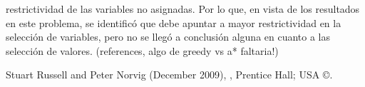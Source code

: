 \documentclass[%
    final,
    reprint,
    notitlepage,
    narroweqnarray,
    inline,
    twoside,
    invited
    ]{ieee}
\begin{document}
restrictividad de las variables no asignadas. Por lo que, en vista de los resultados en este problema, se identificó que debe apuntar a mayor restrictividad 
en la selección de variables, pero no se llegó a conclusión alguna en cuanto a las selección de valores.
(references, algo de greedy vs a* faltaria!)
%
%
%
%
%


\begin{thebibliography}{1}

Stuart Russell and Peter Norvig (December 2009),
,
\newblock Prentice Hall; USA \copyright.







\end{thebibliography}

\end{document}

